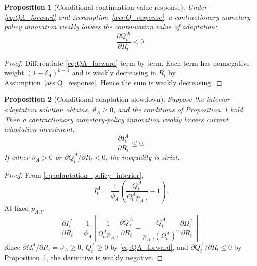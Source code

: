 ﻿\documentclass[12pt]{article}
\newtheorem{proposition}{Proposition}
\theoremstyle{remark}
\begin{document}
\begin{proposition}[Conditional continuation-value response]\label{prop:Q_response}
Under \eqref{eq:QA_forward} and Assumption~\ref{ass:Q_response}, a contractionary
monetary-policy innovation weakly lowers the continuation value of adaptation:
\begin{equation}
    \frac{\partial Q_t^A}{\partial R_t}\le 0.
    \label{eq:Q_R_negative}
\end{equation}
\end{proposition}

\begin{proof}
Differentiate \eqref{eq:QA_forward} term by term. Each term has nonnegative weight
$(1-\delta_A)^{k-1}$ and is weakly decreasing in $R_t$ by Assumption~\ref{ass:Q_response}. Hence
the sum is weakly decreasing.
\end{proof}

\begin{proposition}[Conditional adaptation slowdown]\label{prop:adaptation_slowdown}
Suppose the interior adaptation solution obtains, $\vartheta_A\ge 0$, and the conditions of
Proposition~\ref{prop:Q_response} hold. Then a contractionary monetary-policy innovation weakly
lowers current adaptation investment:
\begin{equation}
    \frac{\partial I_t^A}{\partial R_t}\le 0.
    \label{eq:I_R_negative}
\end{equation}
If either $\vartheta_A>0$ or $\partial Q_t^A/\partial R_t<0$, the inequality is strict.
\end{proposition}

\begin{proof}
From \eqref{eq:adaptation_policy_interior},
\begin{equation}
    I_t^A
    =
    \frac{1}{\phi_A}
    \left(
        \frac{Q_t^A}{\Omega_t^A p_{A,t}}-1
    \right).
    \label{eq:I_policy_for_derivative}
\end{equation}
At fixed $p_{A,t}$,
\begin{equation}
    \frac{\partial I_t^A}{\partial R_t}
    =
    \frac{1}{\phi_A}
    \left[
        \frac{1}{\Omega_t^A p_{A,t}}
        \frac{\partial Q_t^A}{\partial R_t}
        -
        \frac{Q_t^A}{p_{A,t}(\Omega_t^A)^2}
        \frac{\partial\Omega_t^A}{\partial R_t}
    \right].
    \label{eq:I_R_derivative}
\end{equation}
Since $\partial\Omega_t^A/\partial R_t=\vartheta_A\ge 0$, $Q_t^A\ge 0$ by
\eqref{eq:QA_forward}, and $\partial Q_t^A/\partial R_t\le 0$ by
Proposition~\ref{prop:Q_response}, the derivative is weakly negative.
\end{proof}
\end{document}
